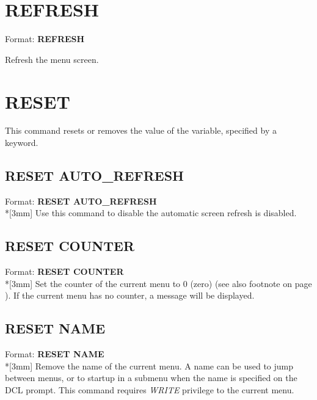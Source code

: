 \documentclass[a4paper]{book}
\renewcommand{\indent}{\hspace*{5mm}}
\begin{document}
\section{REFRESH}
\label{subsec:refresh}

\indent Format: \textbf{REFRESH}

\noindent Refresh the menu screen.

\section{RESET}
\label{subsec:reset}

This command resets or removes the value of the variable, specified by a 
keyword.

\subsection{RESET AUTO{\_}REFRESH}
\label{subsubsec:reset}

\indent Format: \textbf{RESET AUTO{\_}REFRESH}\\*[3mm]
Use this command to disable the automatic screen refresh is disabled.

\subsection{RESET COUNTER}
\label{subsubsec:mylabel70}

\indent Format: \textbf{RESET COUNTER}\\*[3mm]
Set the counter of the current menu to 0 (zero) (see also footnote 
 on page \pageref{fnote:resetcounter}).
If the current menu has no counter, a message will be displayed.

\subsection{RESET NAME}
\label{subsubsec:mylabel71}

\indent Format: \textbf{RESET NAME}\dag\\*[3mm]
Remove the name of the current menu. A name can be used to jump between 
menus, or to startup in a submenu when the name is specified on the DCL 
prompt. This command requires \textsl{WRITE} privilege to the current menu.
\end{document}
